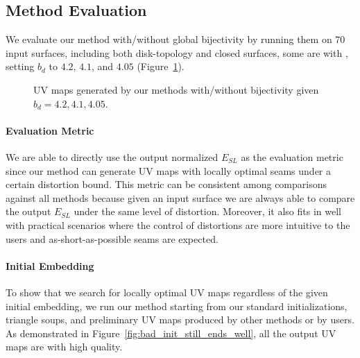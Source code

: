 

\subsection{Method Evaluation}

We evaluate our method with/without global bijectivity by running them on 70 input surfaces, including both disk-topology and closed surfaces, some are with , setting $b_d$ to $4.2$, $4.1$, and $4.05$ (Figure~\ref{fig:our_impressive_results}).

\begin{figure}[!h]
\centering
\caption{UV maps generated by our methods with/without bijectivity given $b_d = 4.2, 4.1, 4.05$.}
\label{fig:our_impressive_results}
\end{figure}

\paragraph{Evaluation Metric}
We are able to directly use the output normalized $E_{SL}$ as the evaluation metric since our method can generate UV maps with locally optimal seams under a certain distortion bound. This metric can be consistent among comparisons against all methods because given an input surface we are always able to compare the output $E_{SL}$ under the same level of distortion. Moreover, it also fits in well with practical scenarios where the control of distortions are more intuitive to the users and as-short-as-possible seams are expected.

\paragraph{Initial Embedding}
 To show that we search for locally optimal UV maps regardless of the given initial embedding, we run our method starting from our standard initializations, triangle soups, and preliminary UV maps produced by other methods or by users. As demonstrated in Figure~\ref{fig:bad_init_still_ends_well}, all the output UV maps are with high quality.


